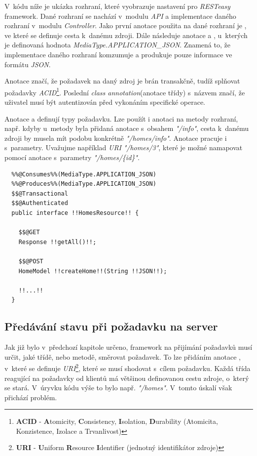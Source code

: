 V~kódu níže je ukázka rozhraní, které vyobrazuje nastavení pro \emph{RESTeasy} framework.
Dané rozhraní se nachází v~modulu \emph{API} a implementace daného rozhraní v~modulu \emph{Controller}.
Jako první anotace použita na dané rozhraní je , ve které se definuje cesta k~danému zdroji.
Dále následuje anotace  a , u~kterých je definovaná hodnota \emph{MediaType.APPLICATION\_JSON}.
Znamená to, že implementace daného rozhraní komzumuje a produkuje pouze informace ve formátu \emph{JSON}.

Anotace  značí, že požadavek na daný zdroj je brán transakčně, tudíž splňovat požadavky \emph{ACID}\footnote{\textbf{ACID} - \textbf{A}tomicity, \textbf{C}onsistency, \textbf{I}solation, \textbf{D}urability (Atomicita, Konzistence, Izolace a Trvanlivost)}.
Poslední \emph{class annotation}(anotace třídy) s~názvem  značí, že uživatel musí být autentizován před vykonáním specifické operace.

Anotace  a  definují typy požadavku.
Lze použít i anotaci  na metody rozhraní, např. kdyby u~metody byla přidaná anotace  s~obsahem \emph{"/info"}, cesta k~danému zdroji
by musela mít podobu konkrétně \emph{"/homes/info"}.
Anotace  pracuje i s~parametry.
Uvažujme například \emph{URI} \emph{"/homes/3"}, které je možné namapovat pomocí anotace  s~parametry \emph{"/homes/\{id\}"}.

\begin{lstlisting}[style=JavaStyle, caption={Ukázka deklarování rozhraní pro správu domácností}]
  %%@Path%%("/homes")
  %%@Consumes%%(MediaType.APPLICATION_JSON)
  %%@Produces%%(MediaType.APPLICATION_JSON)
  $$@Transactional
  $$@Authenticated
  public interface !!HomesResource!! {

    $$@GET
    Response !!getAll()!!;

    $$@POST
    HomeModel !!createHome!!(String !!JSON!!);

    !!...!!
  }
\end{lstlisting}

\newpage
\subsection*{Předávání stavu při požadavku na server}
\label{impl:backend:state}

Jak již bylo v~předchozí kapitole určeno, framework na přijímání požadavků musí určit, jaké třídě, nebo metodě, směrovat požadavek.
To lze přidáním anotace , v~které se definuje \emph{URI}\footnote{\textbf{URI} - \textbf{U}niform \textbf{R}esource \textbf{I}dentifier (jednotný identifikátor zdroje)}, které se musí shodovat s~cílem požadavku.
Každá třída reagující na požadavky od klientů má většinou definovanou cestu zdroje, o~který se stará.
V~úryvku kódu výše to bylo např. \emph{"/homes"}.
V~tomto úskalí však přichází problém.

